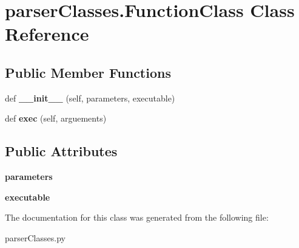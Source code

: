 \hypertarget{classparser_classes_1_1_function_class}{}\section{parser\+Classes.\+Function\+Class Class Reference}
\label{classparser_classes_1_1_function_class}
\subsection*{Public Member Functions}
\begin{DoxyCompactItemize}
\item 
def {\bfseries \+\_\+\+\_\+init\+\_\+\+\_\+} (self, parameters, executable)\hypertarget{classparser_classes_1_1_function_class_a3dd07341f748d2cae25c1ffbf6f3641c}{}\label{classparser_classes_1_1_function_class_a3dd07341f748d2cae25c1ffbf6f3641c}

\item 
def {\bfseries exec} (self, arguements)\hypertarget{classparser_classes_1_1_function_class_a8d89032cea7e396eaffc98d572e737b9}{}\label{classparser_classes_1_1_function_class_a8d89032cea7e396eaffc98d572e737b9}

\end{DoxyCompactItemize}
\subsection*{Public Attributes}
\begin{DoxyCompactItemize}
\item 
{\bfseries parameters}\hypertarget{classparser_classes_1_1_function_class_a1f37f5c3fbb128ce369287d734e5f164}{}\label{classparser_classes_1_1_function_class_a1f37f5c3fbb128ce369287d734e5f164}

\item 
{\bfseries executable}\hypertarget{classparser_classes_1_1_function_class_add23b914232d1773d68db10d9870d674}{}\label{classparser_classes_1_1_function_class_add23b914232d1773d68db10d9870d674}

\end{DoxyCompactItemize}


The documentation for this class was generated from the following file\+:\begin{DoxyCompactItemize}
\item 
parser\+Classes.\+py\end{DoxyCompactItemize}
